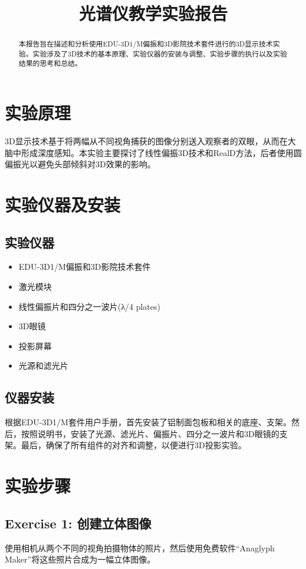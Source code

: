 \documentclass{ctexart}
\title{光谱仪教学实验报告}
\begin{document}
\maketitle

\begin{abstract}
本报告旨在描述和分析使用EDU-3D1/M偏振和3D影院技术套件进行的3D显示技术实验。实验涉及了3D技术的基本原理、实验仪器的安装与调整、实验步骤的执行以及实验结果的思考和总结。
\end{abstract}

\section{实验原理}
3D显示技术基于将两幅从不同视角捕获的图像分别送入观察者的双眼，从而在大脑中形成深度感知。本实验主要探讨了线性偏振3D技术和RealD方法，后者使用圆偏振光以避免头部倾斜对3D效果的影响。

\section{实验仪器及安装}
\subsection{实验仪器}
\begin{itemize}
    \item EDU-3D1/M偏振和3D影院技术套件
    \item 激光模块
    \item 线性偏振片和四分之一波片(λ/4 plates)
    \item 3D眼镜
    \item 投影屏幕
    \item 光源和滤光片
\end{itemize}
\subsection{仪器安装}
根据EDU-3D1/M套件用户手册，首先安装了铝制面包板和相关的底座、支架。然后，按照说明书，安装了光源、滤光片、偏振片、四分之一波片和3D眼镜的支架。最后，确保了所有组件的对齐和调整，以便进行3D投影实验。

\section{实验步骤}

\subsection{Exercise 1: 创建立体图像}
使用相机从两个不同的视角拍摄物体的照片，然后使用免费软件“Anaglyph Maker”将这些照片合成为一幅立体图像。
\end{document}
